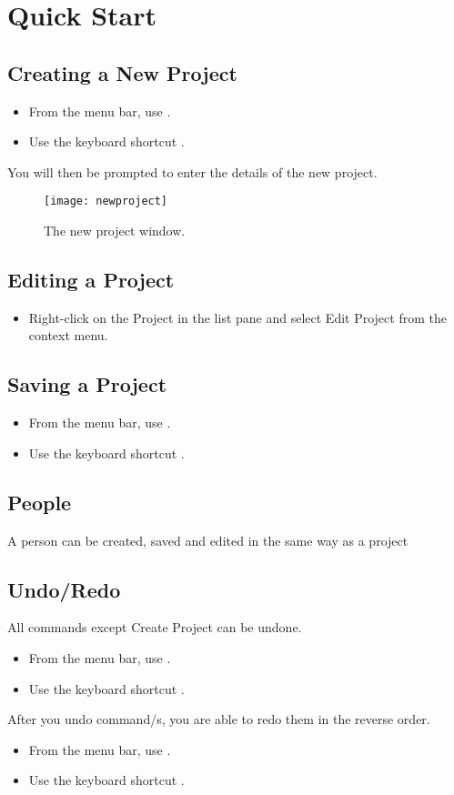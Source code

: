 \documentclass[11pt,fleqn]{book} %
\begin{document}
\section{Quick Start}
\subsection{Creating a New Project}
\begin{itemize}
  \item From the menu bar, use .
  \item Use the keyboard shortcut .
\end{itemize}
You will then be prompted to enter the details of the new project.

\begin{figure}[h]
  \centering
  \texttt{[image: newproject]}
  \caption{The new project window.\label{newproject}}
\end{figure}

\subsection{Editing a Project}
\begin{itemize}
  \item Right-click on the Project in the list pane and select Edit Project from the context menu.
\end{itemize}

\subsection{Saving a Project}
\begin{itemize}
  \item From the menu bar, use .
  \item Use the keyboard shortcut .
\end{itemize}

\subsection{People}
A person can be created, saved and edited in the same way as a project

\subsection{Undo/Redo}
All commands except Create Project can be undone.
\begin{itemize}
  \item From the menu bar, use .
  \item Use the keyboard shortcut .
\end{itemize}
After you undo command/s, you are able to redo them in the reverse order.
\begin{itemize}
  \item From the menu bar, use .
  \item Use the keyboard shortcut .
\end{itemize}
\end{document}
